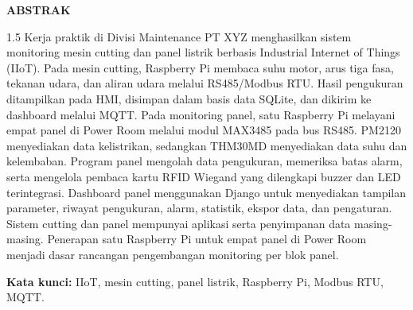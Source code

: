 \cleardoublepage
{}
{}
\begin{center}
{\FontJudulHalaman\bfseries ABSTRAK\par}
\end{center}
\vspace{12pt}
\begin{spacing}{1.5}
Kerja praktik di Divisi Maintenance PT XYZ menghasilkan sistem monitoring mesin cutting dan panel listrik berbasis Industrial Internet of Things (IIoT). Pada mesin cutting, Raspberry Pi membaca suhu motor, arus tiga fasa, tekanan udara, dan aliran udara melalui RS485/Modbus RTU. Hasil pengukuran ditampilkan pada HMI, disimpan dalam basis data SQLite, dan dikirim ke dashboard melalui MQTT. Pada monitoring panel, satu Raspberry Pi melayani empat panel di Power Room melalui modul MAX3485 pada bus RS485. PM2120 menyediakan data kelistrikan, sedangkan THM30MD menyediakan data suhu dan kelembaban. Program panel mengolah data pengukuran, memeriksa batas alarm, serta mengelola pembaca kartu RFID Wiegand yang dilengkapi buzzer dan LED terintegrasi. Dashboard panel menggunakan Django untuk menyediakan tampilan parameter, riwayat pengukuran, alarm, statistik, ekspor data, dan pengaturan. Sistem cutting dan panel mempunyai aplikasi serta penyimpanan data masing-masing. Penerapan satu Raspberry Pi untuk empat panel di Power Room menjadi dasar rancangan pengembangan monitoring per blok panel.
\end{spacing}
\vspace{6pt}
\noindent\textbf{Kata kunci:} IIoT, mesin cutting, panel listrik, Raspberry Pi, Modbus RTU, MQTT.
